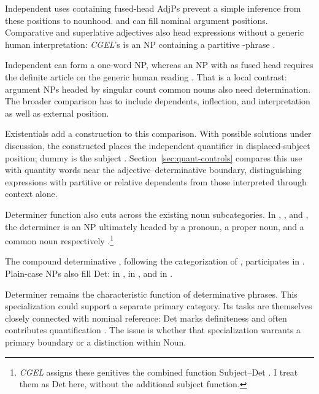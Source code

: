 \documentclass[12pt]{article}
\begin{document}
Independent uses containing fused-head AdjPs prevent a simple inference from these positions to nounhood.  and  can fill nominal argument positions. Comparative and superlative adjectives also head expressions without a generic human interpretation: \textit{CGEL}'s  is an NP containing a partitive -phrase \citep[332--333, 416--423]{huddleston2002}.

Independent  can form a one-word NP, whereas an NP with  as fused head requires the definite article  on the generic human reading \citep[417--418]{huddleston2002}. That is a local contrast: argument NPs headed by singular count common nouns also need determination. The broader comparison has to include dependents, inflection, and interpretation as well as external position.

Existentials add a construction to this comparison. With possible solutions under discussion, the constructed  places the independent quantifier in displaced-subject position; dummy  is the subject \citep[1391--1393]{huddleston2002}. Section~\ref{sec:quant-controls} compares this use with quantity words near the adjective--determinative boundary, distinguishing expressions with partitive or relative dependents from those interpreted through context alone.

Determiner function also cuts across the existing noun subcategories. In , , and , the determiner is an NP ultimately headed by a pronoun, a proper noun, and a common noun respectively \citep[354--355, 470--471]{huddleston2002}.\footnote{\textit{CGEL} assigns these genitives the combined function Subject--Det \citep[472--473]{huddleston2002}. I treat them as Det here, without the additional subject function.}

The compound determinative , following the categorization of \textcite[§1.3]{Payne2007}, participates in . Plain-case NPs also fill Det:  in ,  in , and  in  \citep[356]{huddleston2002}.

Determiner remains the characteristic function of determinative phrases. This specialization could support a separate primary category. Its tasks are themselves closely connected with nominal reference: Det marks definiteness and often contributes quantification \citep[354--359]{huddleston2002}. The issue is whether that specialization warrants a primary boundary or a distinction within Noun.
\end{document}
